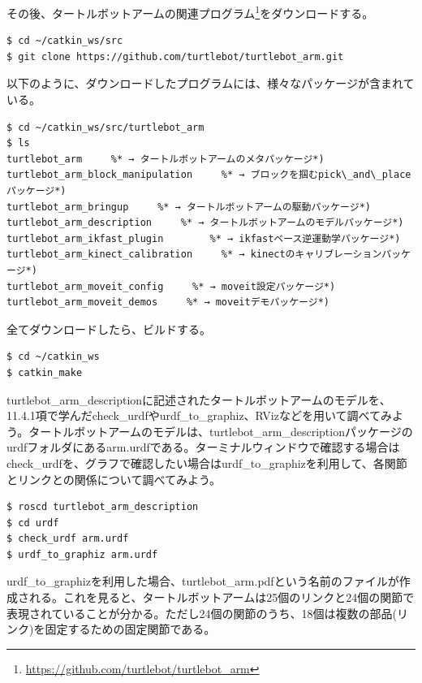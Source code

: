 その後、タートルボットアームの関連プログラム\footnote{\url{https://github.com/turtlebot/turtlebot\_arm}}をダウンロードする。

\begin{lstlisting}[language=ROS]
$ cd ~/catkin_ws/src
$ git clone https://github.com/turtlebot/turtlebot_arm.git
\end{lstlisting}

以下のように、ダウンロードしたプログラムには、様々なパッケージが含まれている。

\begin{lstlisting}[language=ROS]
$ cd ~/catkin_ws/src/turtlebot_arm
$ ls
turtlebot_arm     %* → タートルボットアームのメタパッケージ*)
turtlebot_arm_block_manipulation     %* → ブロックを掴むpick\_and\_placeパッケージ*)
turtlebot_arm_bringup     %* → タートルボットアームの駆動パッケージ*)
turtlebot_arm_description     %* → タートルボットアームのモデルパッケージ*)
turtlebot_arm_ikfast_plugin        %* → ikfastベース逆運動学パッケージ*)
turtlebot_arm_kinect_calibration     %* → kinectのキャリブレーションパッケージ*)
turtlebot_arm_moveit_config     %* → moveit設定パッケージ*)
turtlebot_arm_moveit_demos     %* → moveitデモパッケージ*)
\end{lstlisting}

全てダウンロードしたら、ビルドする。

\begin{lstlisting}[language=ROS]
$ cd ~/catkin_ws
$ catkin_make
\end{lstlisting}

turtlebot\_arm\_descriptionに記述されたタートルボットアームのモデルを、11.4.1項で学んだcheck\_urdfやurdf\_to\_graphiz、RVizなどを用いて調べてみよう。タートルボットアームのモデルは、turtlebot\_arm\_descriptionパッケージのurdfフォルダにあるarm.urdfである。ターミナルウィンドウで確認する場合はcheck\_urdfを、グラフで確認したい場合はurdf\_to\_graphizを利用して、各関節とリンクとの関係について調べてみよう。

\begin{lstlisting}[language=ROS]
$ roscd turtlebot_arm_description
$ cd urdf
$ check_urdf arm.urdf
$ urdf_to_graphiz arm.urdf
\end{lstlisting}

urdf\_to\_graphizを利用した場合、turtlebot\_arm.pdfという名前のファイルが作成される。これを見ると、タートルボットアームは25個のリンクと24個の関節で表現されていることが分かる。ただし24個の関節のうち、18個は複数の部品(リンク)を固定するための固定関節である。

